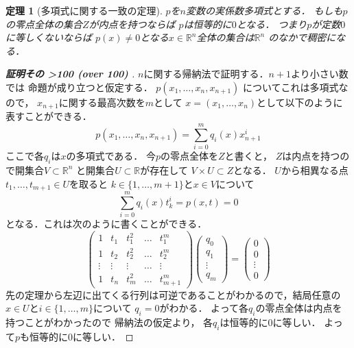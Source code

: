 \documentclass[leqno, a4paper, 12pt]{jsarticle}
\newtheorem{thm}{定理}
\newcommand{\rr}{\mathbb{R}}
\newcounter{mycnt}%
\newcommand{\outcnt}{%
  \the\value{mycnt}%
  \ifnum\value{mycnt}>100 (over 100)\fi%
  \stepcounter{mycnt}%
}
\begin{document}
\begin{thm}[多項式に関する一致の定理]
$p$を$n$変数の実係数多項式とする．
もしも$p$の零点全体の集合$Z$が内点を持つならば
$p$は恒等的に$0$となる．
つまり$p$が定数$0$に等しくないならば
$p(x)\neq 0$となる$x\in \rr^{n}$全体の集合は$\rr^{n}$
のなかで稠密になる．
\end{thm}



\begin{proof}[\textbf{証明その\outcnt}]
$n$に関する帰納法で証明する．$n+1$より小さい数では
命題が成り立つと仮定する．
$p(x_{1}, \dots, x_{n}, x_{n+1})$
についてこれは多項式なので，
$x_{n+1}$に関する最高次数を$m$として
$x=(x_{1}, \dots, x_{n})$として以下のように表すことができる．
\[
p(x_{1}, \dots, x_{n}, x_{n+1})=
\sum_{i=0}^{m}q_{i}(x)x_{n+1}^{i}
\]
ここで各$q_{i}$は$x$の多項式である．
今$p$の零点全体を$Z$と書くと，
$Z$は内点を持つので開集合$V\subset \rr^{n}$
と開集合$U\subset \rr$が存在して
$V\times U\subset Z$となる．
$U$から相異なる点$t_{1}, \dots, t_{m+1}\in U$を取ると
$k\in \{1, \dots, m+1\}$と$x\in V$について
\[
\sum_{i=0}^{m}q_{i}(x)t_{k}^{i}=
p(x, t)=0
\]
となる．これは次のように書くことができる．
\[
\begin{pmatrix}
1 & t_{1} & t_{1}^{2} & \dots & t_{1}^{m}\\
1 & t_{2} & t_{2}^{2} & \dots & t_{2}^{m}\\
\vdots & \vdots  &  \vdots & \dots &\vdots\\
1 & t_{n} & t_{m}^{2} & \dots & t_{m+1}^{m}
\end{pmatrix}
\begin{pmatrix}
q_{0}\\
q_{1}\\
\vdots\\
q_{m}
\end{pmatrix}
=
\begin{pmatrix}
0\\
0\\
\vdots\\
0
\end{pmatrix}
\]
先の定理から左辺に出てくる行列は可逆であることがわかるので，結局任意の$x\in U$と$i\in \{1, \dots, m\}$について
$q_{i}=0$がわかる．
よって各$q_{i}$の零点全体は内点を持つことがわかったので
帰納法の仮定より，
各$q_{i}$は恒等的に$0$に等しい．
よって$p$も恒等的に$0$に等しい．
\end{proof}
\end{document}
